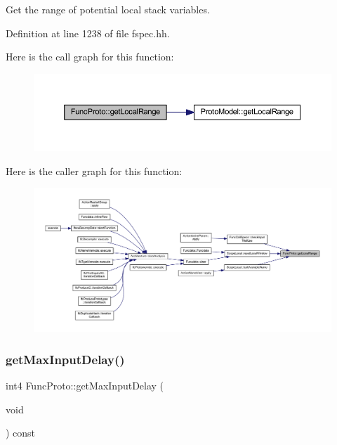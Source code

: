 Get the range of potential local stack variables. 



Definition at line 1238 of file fspec.\+hh.

Here is the call graph for this function\+:
\nopagebreak
\begin{figure}[H]
\begin{center}
\leavevmode
\includegraphics[width=350pt]{class_func_proto_ad8bbc6db7bc4ae8105688a0321fa1ae4_cgraph}
\end{center}
\end{figure}
Here is the caller graph for this function\+:
\nopagebreak
\begin{figure}[H]
\begin{center}
\leavevmode
\includegraphics[width=350pt]{class_func_proto_ad8bbc6db7bc4ae8105688a0321fa1ae4_icgraph}
\end{center}
\end{figure}
\mbox{\label{class_func_proto_a07b4705cc5b9695e8c96e1e9294f0cfb}} 
\subsubsection{\texorpdfstring{getMaxInputDelay()}{getMaxInputDelay()}}
{\footnotesize\ttfamily int4 Func\+Proto\+::get\+Max\+Input\+Delay (\begin{DoxyParamCaption}\item[{void}]{ }\end{DoxyParamCaption}) const\hspace{0.3cm}{\ttfamily [inline]}}



